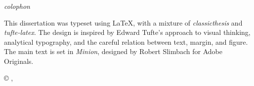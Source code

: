 \cleardoublepage
\thispagestyle{plain}
\vspace*{0.17\textheight}
{\normalfont\itshape colophon\par}
\vspace{1.2em}


This dissertation was typeset using \LaTeX{}, with a mixture of \emph{classicthesis} and \emph{tufte-latex}. The design is inspired by Edward Tufte’s approach to visual thinking, analytical typography, and the careful relation between text, margin, and figure. The main text is set in \emph{Minion}, designed by Robert Slimbach for Adobe Originals.


\vfill
\noindent\thesistitle\par
\noindent\copyright{} \thesisdate, \thesisauthor
